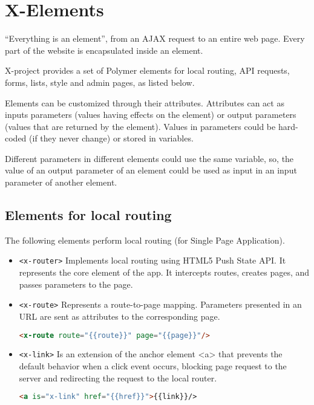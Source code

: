 \section{X-Elements}
\label{sec:XPR_xel}

``Everything is an element'', from an AJAX request to an entire web page. Every part of the website is encapsulated inside an element.

X-project provides a set of Polymer elements for local routing, API requests, forms, lists, style and admin pages, as listed below.

Elements can be customized through their attributes. Attributes can act as inputs parameters (values having effects on the element) or output parameters (values that are returned by the element). Values in parameters could be hard-coded (if they never change) or stored in variables.

Different parameters in different elements could use the same variable, so, the value of an output parameter of an element could be used as input in an input parameter of another element.

\subsection{Elements for local routing}

The following elements perform local routing (for Single Page Application).
\begin{itemize}
\item \texttt{<x-router>} Implements local routing using HTML5 Push State API. It represents the core element of the app. It intercepts routes, creates pages, and passes parameters to the page.
\item \texttt{<x-route>} Represents a route-to-page mapping. Parameters presented in an URL are sent as attributes to the corresponding page.
\begin{lstlisting}[language=html]
<x-route route="{{route}}" page="{{page}}"/>
\end{lstlisting}
\item \texttt{<x-link>} Is an extension of the anchor element <a> that prevents the default behavior when a click event occurs, blocking page request to the server and redirecting the request to the local router.
\begin{lstlisting}[language=html]
<a is="x-link" href="{{href}}">{{link}}/>
\end{lstlisting}
\end{itemize}

